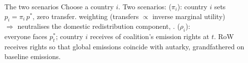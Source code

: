 \documentclass[aspectratio=169,xcolor=dvipsnames, 11pt,mathserif]{beamer}
\begin{document}
\begin{frame}{The two scenarios\label{scenarios}}
\bbvsp
\ip Choose a country $i$. Two scenarios:
\ip {} ($\pi_i$): country $i$ sets $p_i=\pi_i\,p^*$, zero transfer. %
  \bbvsp
  \ip {} weighting (transfers $\propto$ inverse marginal utility) \\ $\Rightarrow$ neutralises the domestic redistribution component, .
  \ee
\ip {} ($\rho_i$): \\everyone faces $p_t^*$; country $i$ receives  of coalition's emission rights at $t$. 
  \bbvsp
  \ip RoW receives rights so that global emissions coincide with autarky, grandfathered on baseline emissions. %
  \ee
\ee
\end{frame}
\end{document}
